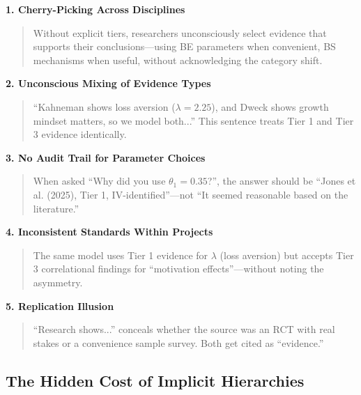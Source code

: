 \documentclass[11pt, a4paper]{article}
\begin{document}
\begin{tcolorbox}[colback=red!5!white, colframe=red!75!black,
    title=The Five Dangers of Implicit Evidence Hierarchies]

\textbf{1. Cherry-Picking Across Disciplines}
\begin{quote}
Without explicit tiers, researchers unconsciously select evidence that supports their conclusions---using BE parameters when convenient, BS mechanisms when useful, without acknowledging the category shift.
\end{quote}

\textbf{2. Unconscious Mixing of Evidence Types}
\begin{quote}
``Kahneman shows loss aversion ($\lambda = 2.25$), and Dweck shows growth mindset matters, so we model both...'' This sentence treats Tier 1 and Tier 3 evidence identically.
\end{quote}

\textbf{3. No Audit Trail for Parameter Choices}
\begin{quote}
When asked ``Why did you use $\theta_1 = 0.35$?'', the answer should be ``Jones et al. (2025), Tier 1, IV-identified''---not ``It seemed reasonable based on the literature.''
\end{quote}

\textbf{4. Inconsistent Standards Within Projects}
\begin{quote}
The same model uses Tier 1 evidence for $\lambda$ (loss aversion) but accepts Tier 3 correlational findings for ``motivation effects''---without noting the asymmetry.
\end{quote}

\textbf{5. Replication Illusion} \citep{simmons2011}
\begin{quote}
``Research shows...'' conceals whether the source was an RCT with real stakes or a convenience sample survey. Both get cited as ``evidence.''
\end{quote}

\end{tcolorbox}

\subsection{The Hidden Cost of Implicit Hierarchies}
\end{document}
